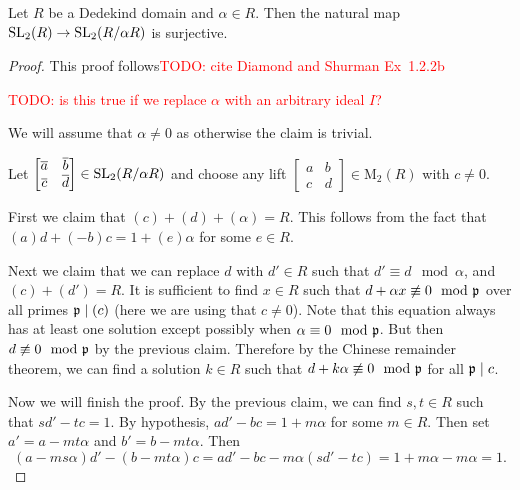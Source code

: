 \documentclass{amsart}
\begin{document}
\begin{lemma}\label{lem:quot-surj-SL2}
  Let $R$ be a Dedekind domain and $\alpha \in R$. Then the natural map $\operatorname{SL}_2(R) \to \operatorname{SL}_2(R/\alpha R)$ is surjective.
\end{lemma}
\begin{proof}
  This proof follows\textcolor{red}{TODO: cite Diamond and Shurman Ex~1.2.2b}

  \textcolor{red}{TODO: is this true if we replace $\alpha$ with an arbitrary ideal $I$?}

  We will assume that $\alpha \neq 0$ as otherwise the claim is trivial.

  Let $\begin{bmatrix} \overline{a} & \overline{b} \\ \overline{c} & \overline{d} \end{bmatrix} \in \operatorname{SL}_2(R/\alpha R)$ and choose any lift $\begin{bmatrix} a & b \\ c & d \end{bmatrix} \in \mathrm{M}_2(R)$ with $c \neq 0$.

  First we claim that $(c) + (d) + (\alpha) = R$. This follows from the fact that $(a)d + (-b)c = 1 + (e)\alpha$ for some $e \in R$.

  Next we claim that we can replace $d$ with $d' \in R$ such that $d' \equiv d \mod{\alpha}$, and $(c) + (d') = R$. It is sufficient to find $x \in R$ such that $d + \alpha x \not\equiv 0 \mod{\frak{p}}$ over all primes $\frak{p} \mid (c)$ (here we are using that $c \neq 0$). Note that this equation always has at least one solution except possibly when $\alpha \equiv 0 \mod{\frak{p}}$. But then $d \not\equiv 0 \mod{\frak{p}}$ by the previous claim. Therefore by the Chinese remainder theorem, we can find a solution $k \in R$ such that $d + k\alpha \not\equiv 0 \mod{\frak{p}}$ for all $\frak{p} \mid c$.

  Now we will finish the proof. By the previous claim, we can find $s,t \in R$ such that $sd' - tc = 1$.  By hypothesis, $ad' - bc = 1 + m\alpha$ for some $m \in R$. Then set $a' = a - mt\alpha$ and $b' = b - mt\alpha$. Then
  \[
    (a - ms\alpha)d' - (b - mt\alpha)c
    =
    ad' - bc - m\alpha(sd' - tc)
    =
    1 + m\alpha - m\alpha
    =
    1.
  \]
\end{proof}
\end{document}
